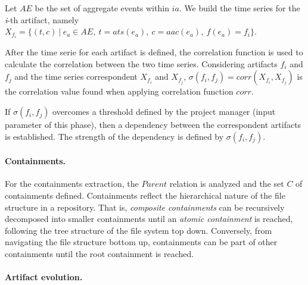 Let $AE$ be the set of aggregate events within $ia$. We build the time series for the \emph{i}-th artifact, namely $X_{f_i} = \lbrace (t, c) ~|~ e_a \in AE,~ t = ats(e_a),~ c = aac(e_a),~ f(e_a) = {f_i} \rbrace $. 


After the time serie for each artifact is defined, the correlation function is used to calculate the correlation between the two time series. Considering artifacts $f_i$ and $f_j$ and the time series correspondent $X_{f_i}$ and $X_{f_j}$, $\sigma(f_i,f_j) = {corr(X_{f_i}, X_{f_j})}$ is the correlation value found when applying correlation function $corr$.

If $\sigma(f_i,f_j)$ overcomes a threshold defined by the project manager (input parameter of this phase), then a dependency between the correspondent artifacts is established. The strength of the dependency is defined by $\sigma(f_i,f_j)$. 

\paragraph{Containments.}
For the containments extraction, the $Parent$ relation is analyzed and the set $C$ of containments defined.
Containments reflect the hierarchical nature of the file structure in a repository. That is, \emph{composite containments} can be recursively decomposed into smaller containments until an \emph{atomic containment} is reached, following the tree structure of the file system top down. Conversely, from navigating the file structure bottom up, containments can be part of other containments until the root containment is reached. 


\paragraph{Artifact evolution.}

